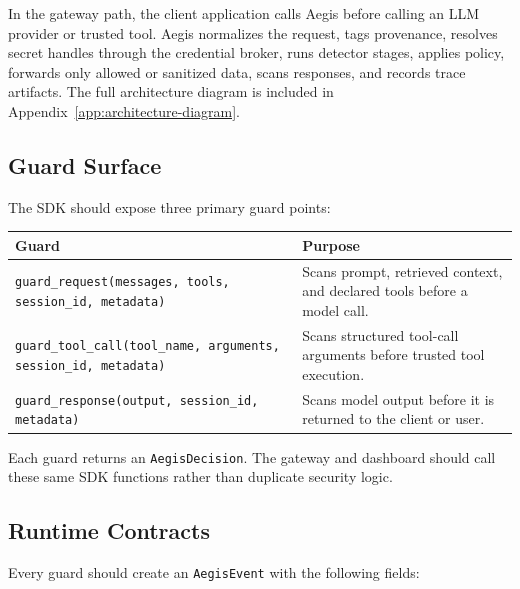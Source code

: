 \documentclass[11pt,letterpaper]{article}
\begin{document}
In the gateway path, the client application calls Aegis before calling an LLM provider or trusted tool. Aegis normalizes the request, tags provenance, resolves secret handles through the credential broker, runs detector stages, applies policy, forwards only allowed or sanitized data, scans responses, and records trace artifacts. The full architecture diagram is included in Appendix~\ref{app:architecture-diagram}.

\subsection{Guard Surface}

The SDK should expose three primary guard points:

\begin{longtable}{p{}p{}}
\toprule
\textbf{Guard} & \textbf{Purpose} \\
\midrule
\texttt{guard\_request(messages, tools, session\_id, metadata)} & Scans prompt, retrieved context, and declared tools before a model call. \\
\texttt{guard\_tool\_call(tool\_name, arguments, session\_id, metadata)} & Scans structured tool-call arguments before trusted tool execution. \\
\texttt{guard\_response(output, session\_id, metadata)} & Scans model output before it is returned to the client or user. \\
\bottomrule
\end{longtable}

Each guard returns an \texttt{AegisDecision}. The gateway and dashboard should call these same SDK functions rather than duplicate security logic.

\subsection{Runtime Contracts}

Every guard should create an \texttt{AegisEvent} with the following fields:
\end{document}
